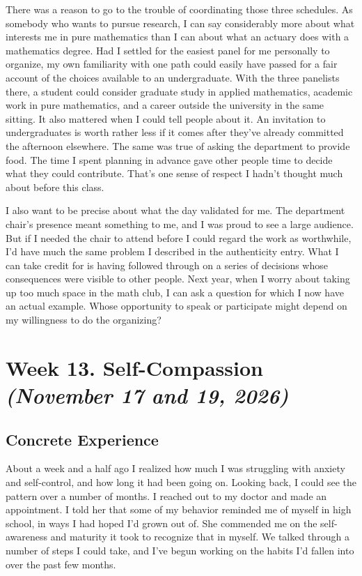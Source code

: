 \documentclass[12pt,letterpaper]{article}
\newcommand{\entry}[1]{\clearpage\section{#1}}
\begin{document}
There was a reason to go to the trouble of coordinating those three schedules. As somebody who wants to pursue research, I can say considerably more about what interests me in pure mathematics than I can about what an actuary does with a mathematics degree. Had I settled for the easiest panel for me personally to organize, my own familiarity with one path could easily have passed for a fair account of the choices available to an undergraduate. With the three panelists there, a student could consider graduate study in applied mathematics, academic work in pure mathematics, and a career outside the university in the same sitting. It also mattered when I could tell people about it. An invitation to undergraduates is worth rather less if it comes after they've already committed the afternoon elsewhere. The same was true of asking the department to provide food. The time I spent planning in advance gave other people time to decide what they could contribute. That's one sense of respect I hadn't thought much about before this class.

I also want to be precise about what the day validated for me. The department chair's presence meant something to me, and I was proud to see a large audience. But if I needed the chair to attend before I could regard the work as worthwhile, I'd have much the same problem I described in the authenticity entry. What I can take credit for is having followed through on a series of decisions whose consequences were visible to other people. Next year, when I worry about taking up too much space in the math club, I can ask a question for which I now have an actual example. Whose opportunity to speak or participate might depend on my willingness to do the organizing?

\entry{Week 13. Self-Compassion \textit{(November 17 and 19, 2026)}}
\subsection{Concrete Experience}
About a week and a half ago I realized how much I was struggling with anxiety and self-control, and how long it had been going on. Looking back, I could see the pattern over a number of months. I reached out to my doctor and made an appointment. I told her that some of my behavior reminded me of myself in high school, in ways I had hoped I'd grown out of. She commended me on the self-awareness and maturity it took to recognize that in myself. We talked through a number of steps I could take, and I've begun working on the habits I'd fallen into over the past few months.
\end{document}
